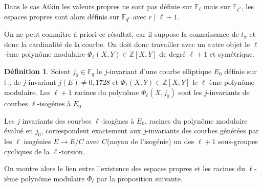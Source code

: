 \documentclass[10pt,a4paper]{book}
\theoremstyle{plain}
\theoremstyle{definition}
\theoremstyle{definition}
\theoremstyle{definition}
\theoremstyle{definition}
\newtheorem{defi}[thm]{Définition}
\theoremstyle{remark}
\theoremstyle{remark}
\begin{document}
	Dans le cas Atkin les valeurs propres ne sont pas définie sur $\mathbb{F}_\ell$ mais sur $\mathbb{F}_{\ell^2}$, les espaces propres sont alors définis sur $\mathbb{F}_{q^r}$ avec $r \mid \ell+1$.
	
	
	On ne peut connaître à priori ce résultat, car il suppose la connaissance de $t_{\pi}$ et donc la cardinalité de la courbe. On doit donc travailler avec un autre objet le $\ell$-ème polynôme modulaire $\Phi_{\ell}(X,Y) \in \mathbb{Z}[X,Y] $ de degré $\ell+1$ et symétrique. 
 
\begin{defi}
Soient $j_0 \in \mathbb{F}_q$ le $j$-invariant d'une courbe elliptique $E_0$ définie sur $\mathbb{F}_q$ de $j$-invariant $j(E) \neq 0,1728$ et  $\Phi_{\ell}(X,Y) \in \mathbb{Z}[X,Y] $ le $\ell$-ème polynôme modulaire. Les $\ell+1$ racines du polynôme $\Phi_{\ell}(X,j_0)$ sont les $j$-invariants de courbes $\ell$-isogénes à $E_0$. 
\end{defi} 
Les $j$ invariants des courbes $\ell$-isogènes à $E_0$, racines du polynôme modulaire évalué en $j_0$, correspondent exactement aux $j$-invariants des  courbes générées par les $\ell$ isogénies $E \to E/C$ avec $C$(noyau de l'isogénie) un des $\ell+1$ sous-groupes cycliques de la $\ell$-torsion. 

On montre alors le lien entre l'existence des espaces propres et les racines du $\ell$-ième polynôme modulaire $\Phi_{\ell}$ par la proposition suivante. 

 
 
 
\end{document}
